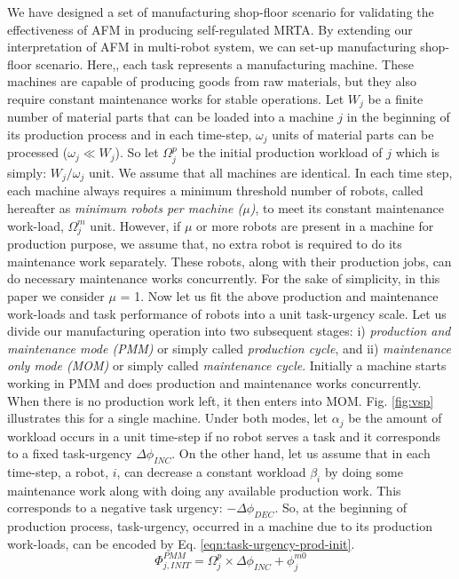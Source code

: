 \documentclass[smallcondensed]{svjour3}
\begin{document}
We have designed a set of  manufacturing shop-floor scenario for validating the effectiveness of AFM in producing self-regulated MRTA. By extending our interpretation of AFM in multi-robot system, we can set-up manufacturing shop-floor  scenario. Here,, each task represents a manufacturing machine. These machines are capable of producing goods from raw materials, but they also require constant maintenance works for stable operations. Let $W_{j}$ be a finite number of material parts that can be loaded into a machine $j$ in the beginning of its production process and in each time-step, $\omega_{j}$ units of material parts can be processed  ($\omega_{j} \ll W_{j} $). So let $\Omega_{j}^{p}$ be the initial production workload of $j$ which is simply: $W_{j} / \omega_{j}$ unit. We assume that all machines are identical. In each time step, each machine always requires a minimum threshold number of robots, called hereafter as {\em minimum robots per machine ($\mu$)}, to meet its constant maintenance work-load, $\Omega_{j}^{m}$ unit. However, if $\mu$ or more robots are present in a machine for production purpose, we assume that, no extra robot is required to do its maintenance work separately. These robots, along with their production jobs, can do necessary maintenance works concurrently. For the sake of simplicity, in this paper we consider $\mu$ = 1.
Now let us fit the above production and maintenance work-loads and task performance of robots into a unit task-urgency scale. Let us divide our manufacturing operation into two subsequent stages: i) {\em production and maintenance mode (PMM)} or simply called {\em production cycle}, and ii) {\em maintenance only mode (MOM)} or simply called {\em maintenance cycle}. Initially a machine starts working in PMM and does production and maintenance works concurrently. When there is no production work left, it then enters into MOM. Fig. \ref{fig:vsp} illustrates this for a single machine.
Under both modes, let $\alpha_{j}$ be the amount of workload occurs in a unit time-step if no robot serves a task and it corresponds to a fixed task-urgency $\Delta \phi_{INC}$. On the other hand, let us assume that in each time-step, a robot, $i$, can decrease a constant workload $\beta_{i}$ by doing some maintenance work along with doing any available production work. This  corresponds to a negative task urgency: $- \Delta \phi_{DEC}$. 
So, at the beginning of production process, task-urgency, occurred in a machine due to its production work-loads, can be encoded by Eq. \ref{eqn:task-urgency-prod-init}.
\begin{equation}
\Phi_{j, INIT}^{PMM} = \Omega_{j}^{p} \times \Delta \phi_{INC} + \phi_{j}^{m0}
\label{eqn:task-urgency-prod-init}
\end{equation}
\end{document}
